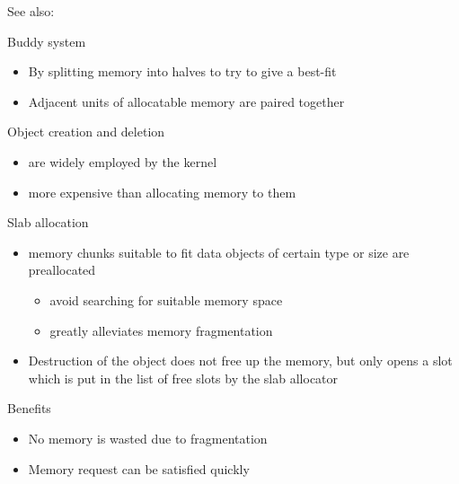 See also: 

\begin{frame}
  \begin{block}{Buddy system}
    \begin{itemize}
    \item By splitting memory into halves to try to give a best-fit
    \item Adjacent units of allocatable memory are paired together
    \end{itemize}
  \end{block}
  \begin{center}
  \end{center}
\end{frame}

\begin{frame}
  \begin{block}{Object creation and deletion}
    \begin{itemize}
    \item are widely employed by the kernel
    \item more expensive than allocating memory to them
    \end{itemize}
  \end{block}
  \begin{block}{Slab allocation}
    \begin{itemize}
    \item memory chunks suitable to fit data objects of certain type or size are
      preallocated
      \begin{itemize}
      \item avoid searching for suitable memory space
      \item greatly alleviates memory fragmentation
      \end{itemize}
    \item Destruction of the object does not free up the memory, but only opens a slot
      which is put in the list of free slots by the slab allocator
    \end{itemize}
  \end{block}
  \begin{block}{Benefits}
    \begin{itemize}
    \item No memory is wasted due to fragmentation
    \item Memory request can be satisfied quickly
    \end{itemize}
  \end{block}
\end{frame}


